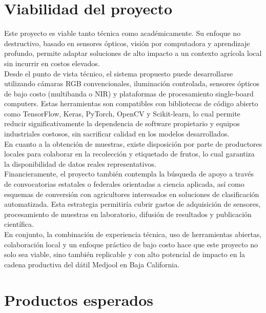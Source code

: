 
\section{Viabilidad del proyecto}

Este proyecto es viable tanto técnica como académicamente. Su enfoque no destructivo, basado en sensores ópticos, visión por computadora y aprendizaje profundo, permite adaptar soluciones de alto impacto a un contexto agrícola local sin incurrir en costos elevados.\\

Desde el punto de vista técnico, el sistema propuesto puede desarrollarse utilizando cámaras RGB convencionales, iluminación controlada, sensores ópticos de bajo costo (multibanda o NIR) y plataformas de procesamiento single-board computers. Estas herramientas son compatibles con bibliotecas de código abierto como TensorFlow, Keras, PyTorch, OpenCV y Scikit-learn, lo cual permite reducir significativamente la dependencia de software propietario y equipos industriales costosos, sin sacrificar calidad en los modelos desarrollados.\\

En cuanto a la obtención de muestras, existe disposición por parte de productores locales para colaborar en la recolección y etiquetado de frutos, lo cual garantiza la disponibilidad de datos reales representativos.\\

Financieramente, el proyecto también contempla la búsqueda de apoyo a través de convocatorias estatales o federales orientadas a ciencia aplicada, así como esquemas de conversión con agricultores interesados en soluciones de clasificación automatizada. Esta estrategia permitiría cubrir gastos de adquisición de sensores, procesamiento de muestras en laboratorio, difusión de resultados y publicación científica.\\

En conjunto, la combinación de experiencia técnica, uso de herramientas abiertas, colaboración local y un enfoque práctico de bajo costo hace que este proyecto no solo sea viable, sino también replicable y con alto potencial de impacto en la cadena productiva del dátil Medjool en Baja California.\\

\section{Productos esperados}

